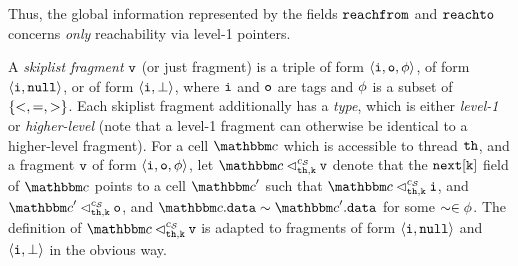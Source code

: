 Thus, the global information represented by the fields $\mathtt{reachfrom}$ and
$\mathtt{reachto}$ concerns {\em only} reachability via level-1 pointers.

A {\em skiplist fragment} $\mathtt{v}$ (or just fragment)
is a triple of form
$\left\langle\mathtt{i},\mathtt{o},\phi\right\rangle$, of form
$\left\langle\mathtt{i},{\tt null}\right\rangle$, or of form
$\left\langle\mathtt{i},\bot\right\rangle$,
where $\mathtt{i}$ and $\mathtt{o}$ are tags
    and $\phi$ is a subset of $\left\{<, =, >\right\}$.
    Each skiplist fragment additionally has a {\em type}, which is
    either {\em level-1} or {\em higher-level} (note that a level-1 fragment
    can otherwise be identical to a higher-level fragment).
For a cell $\cell$ which is accessible to thread ${\tt th}$, and a fragment
$\mathtt{v}$ of form $\left\langle\mathtt{i},\mathtt{o},\phi\right\rangle$, let $\cell \lsatfrag{\klevel}{\thread}{\sconf}\frag$ denote that
the ${\tt next[k]}$ field of $\cell$ points to a cell $\cell'$ such that
  $\cell \lsatfrag{\klevel}{\thread}{\sconf} \inat{\frag}$,
and
$\cell' \lsatfrag{\klevel}{\thread}{\sconf} \outat{\frag}$, and 
  $\cell.\mathtt{data} \sim \cell'.\mathtt{data}$ for some $\sim \in \phi$.
The definition of $\cell \lsatfrag{\klevel}{\thread}{\sconf}\frag$
is adapted to fragments of form
$\left\langle\mathtt{i},{\tt null}\right\rangle$ and $\left\langle\mathtt{i},\bot\right\rangle$ in the
obvious way.

